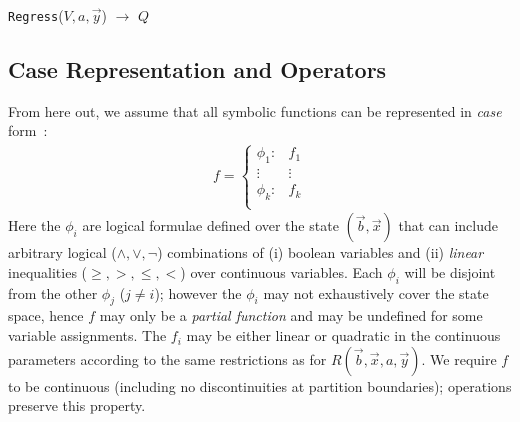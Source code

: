 \incmargin{.5em}
\linesnumbered
\begin{algorithm}[t!]
\dontprintsemicolon
{}


\caption{\footnotesize \texttt{Regress}($V,a,\vec{y}$) $\longrightarrow$ $Q$ \label{alg:regress}}
\end{algorithm}
\decmargin{.5em}

\subsection{Case Representation and Operators}

From here out, we assume that all symbolic functions
can be represented in \emph{case} form~\cite{fomdp}:
{%
\begin{align}
f = 
\begin{cases}
  \phi_1: & f_1 \\ 
 \vdots&\vdots\\ 
  \phi_k: & f_k \\ 
\end{cases} \label{eq:case}
\end{align}
}
Here the $\phi_i$ are logical formulae defined over the state
$(\vec{b},\vec{x})$ that can include arbitrary logical ($\land,\lor,\neg$)
combinations of (i) boolean variables and (ii) 
\emph{linear} inequalities ($\geq,>,\leq,<$) 
over continuous variables.  
Each $\phi_i$ will be disjoint from the other $\phi_j$ ($j \neq i$); 
however the $\phi_i$ may not exhaustively cover the state space, hence
$f$ may only be a \emph{partial function} and may be undefined for some
variable assignments.
The $f_i$ may be either linear or quadratic in the continuous parameters
according to the same restrictions as for 
$R(\vec{b},\vec{x},a,\vec{y})$.  
We require $f$ to be continuous 
(including no discontinuities at partition boundaries); 
operations preserve this property.

